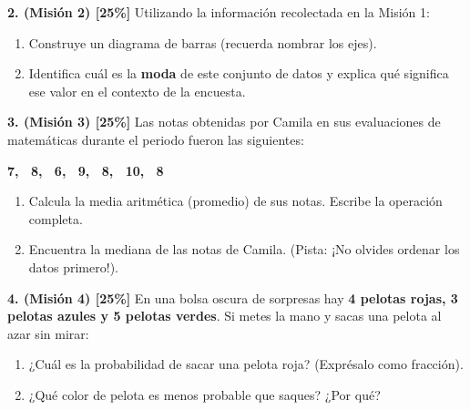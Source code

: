 \documentclass[11pt, letterpaper]{article}
\newif\ifshowanswers
\newcommand{\answer}[1]{
	\ifshowanswers
	\par\vspace{0.15cm}
	\begin{tcolorbox}[colback=blue!5!white, colframe=blue!60!white, arc=1mm, boxrule=0.5pt, title=\textbf{\footnotesize SOLUCIÓN (DOCENTE)}]
		\color{blue!80!black}\footnotesize #1
	\end{tcolorbox}
	\par\vspace{0.15cm}
	\else
	\par\vspace{0.3cm}
	\fi
}
\begin{document}
	\noindent \textbf{2. (Misión 2) [25\%]} Utilizando la información recolectada en la Misión 1:
	\begin{enumerate}[label=\alph*)]
		\item Construye un diagrama de barras (recuerda nombrar los ejes).
		\item Identifica cuál es la \textbf{moda} de este conjunto de datos y explica qué significa ese valor en el contexto de la encuesta.
	\end{enumerate}
	
	\answer{
		\textbf{a)} El estudiante debe dibujar un gráfico donde el eje $X$ sea la "Cantidad de mascotas" (0, 1, 2, 3) y el eje $Y$ sea la "Frecuencia" (número de estudiantes, llegando al menos al 5). Las alturas deben ser 3, 5, 3 y 1 respectivamente. \\
		\textbf{b) Moda:} La moda es \textbf{1 mascota} (frecuencia de 5). Significa que lo más común en ese grupo de estudiantes es tener exactamente una mascota.
	}
	
	\noindent \textbf{3. (Misión 3) [25\%]} Las notas obtenidas por Camila en sus evaluaciones de matemáticas durante el periodo fueron las siguientes: 
	\begin{center}
		\textbf{7, \ 8, \ 6, \ 9, \ 8, \ 10, \ 8}
	\end{center}
	\begin{enumerate}[label=\alph*)]
		\item Calcula la media aritmética (promedio) de sus notas. Escribe la operación completa.
		\item Encuentra la mediana de las notas de Camila. (Pista: ¡No olvides ordenar los datos primero!).
	\end{enumerate}
	
	\answer{
		\textbf{a) Media (Promedio):} Suma de los datos = $7 + 8 + 6 + 9 + 8 + 10 + 8 = 56$. Cantidad de datos ($n$) = 7. \\
		Media = $\frac{56}{7} = \textbf{8}$. \\
		\textbf{b) Mediana:} Ordenando los datos de menor a mayor: 6, 7, 8, \textbf{8}, 8, 9, 10. El dato central (posición 4) es el \textbf{8}. Por tanto, Mediana = 8.
	}
	
	\noindent \textbf{4. (Misión 4) [25\%]} En una bolsa oscura de sorpresas hay \textbf{4 pelotas rojas, 3 pelotas azules y 5 pelotas verdes}. Si metes la mano y sacas una pelota al azar sin mirar:
	\begin{enumerate}[label=\alph*)]
		\item ¿Cuál es la probabilidad de sacar una pelota roja? (Exprésalo como fracción).
		\item ¿Qué color de pelota es menos probable que saques? ¿Por qué?
	\end{enumerate}
	
	\answer{
		\textbf{a) Probabilidad (Roja):} Casos favorables = 4 (rojas). Casos posibles (total de pelotas) = $4 + 3 + 5 = 12$. \\
		Probabilidad = $\mathbf{\frac{4}{12}}$ (Se puede simplificar a $\frac{1}{3}$).\\
		\textbf{b) Menos probable:} El color \textbf{azul} es el menos probable de sacar porque es el que tiene la menor cantidad (frecuencia) en la bolsa (solo 3 pelotas).
	}
	
\end{document}
